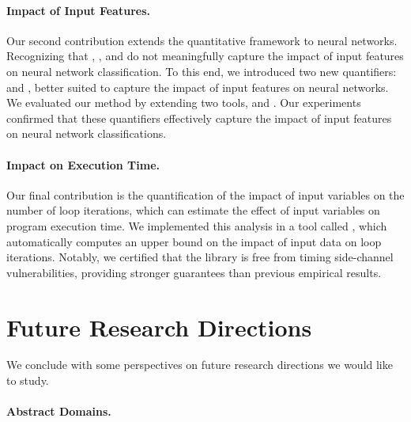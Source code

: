 \paragraph{Impact of Input Features.} Our second contribution extends the quantitative framework to neural networks.
Recognizing that \outcomesname{}, \rangename{}, and \qusedname{} do not meaningfully capture the impact of input features on neural network classification. To this end, we introduced two new quantifiers: \changesname{} and \qlibraname{}, better suited to capture the impact of input features on neural networks.
We evaluated our method by extending two tools, \impatto{} and \libra{}\sidenote{\libraurl}.
Our experiments confirmed that these quantifiers effectively capture the impact of input features on neural network classifications.


\paragraph{Impact on Execution Time.} Our final contribution is the quantification of the impact of input variables on the number of loop iterations, which can estimate the effect of input variables on program execution time. We implemented this analysis in a tool called \timesec\sidenote{\timesecurl}, which automatically computes an upper bound on the impact of input data on loop iterations. Notably, we certified that the \bignum{} library\sidenote{\bignumurl} is free from timing side-channel vulnerabilities, providing stronger guarantees than previous empirical results.


\section*{Future Research Directions}

We conclude with some perspectives on future research directions we would like to study.

\paragraph{Abstract Domains.}

